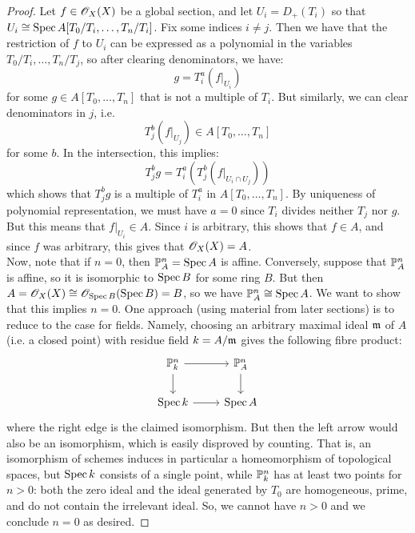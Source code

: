 \begin{proof}
	Let $f \in \mathscr{O}_X(X)$ be a global section, and let $U_i = D_{+}(T_i)$ so that $U_i \cong \operatorname{Spec} A[T_0/T_i,\ldots,T_n/T_i]$. Fix some indices $i \neq j$. Then we have that the restriction of $f$ to $U_i$ can be expressed as a polynomial in the variables $T_0/T_i,\ldots,T_n/T_j$, so after clearing denominators, we have:
	\[ g = T_i^a(f|_{U_i}) \]
	for some $g \in A[T_0,\ldots,T_n]$ that is not a multiple of $T_i$. But similarly, we can clear denominators in $j$, i.e.
	\[ T_j^b(f|_{U_j}) \in A[T_0,\ldots,T_n] \]
	for some $b$. In the intersection, this implies:
	\[ T_j^bg = T_i^a\left(T_j^b(f|_{U_i \cap U_j})\right) \]
	which shows that $T_j^bg$ is a multiple of $T_i^a$ in $A[T_0,\ldots,T_n]$. By uniqueness of polynomial representation, we must have $a=0$ since $T_i$ divides neither $T_j$ nor $g$. But this means that $f|_{U_i} \in A$. Since $i$ is arbitrary, this shows that $f \in A$, and since $f$ was arbitrary, this gives that $\mathscr{O}_X(X) = A$. \\
	
	Now, note that if $n = 0$, then $\mathbb{P}_A^n = \operatorname{Spec} A$ is affine. Conversely, suppose that $\mathbb{P}_A^n$ is affine, so it is isomorphic to $\operatorname{Spec} B$ for some ring $B$. But then $A = \mathscr{O}_X(X) \cong \mathscr{O}_{\operatorname{Spec} B}(\operatorname{Spec} B) = B$, so we have $\mathbb{P}_A^n \cong \operatorname{Spec} A$. We want to show that this implies $n=0$. One approach (using material from later sections) is to reduce to the case for fields. Namely, choosing an arbitrary maximal ideal $\mathfrak{m}$ of $A$ (i.e. a closed point) with residue field $k = A/\mathfrak{m}$ gives the following fibre product:
	\[ \begin{tikzcd} \PP_k^n \arrow{r}{} \arrow{d}{} & \PP_A^n \arrow{d}{} \\ \Spec k \arrow{r}{} & \Spec A \end{tikzcd} \]
	where the right edge is the claimed isomorphism. But then the left arrow would also be an isomorphism, which is easily disproved by counting. That is, an isomorphism of schemes induces in particular a homeomorphism of topological spaces, but $\operatorname{Spec} k$ consists of a single point, while $\mathbb{P}_k^n$ has at least two points for $n > 0$: both the zero ideal and the ideal generated by $T_0$ are homogeneous, prime, and do not contain the irrelevant ideal. So, we cannot have $n>0$ and we conclude $n=0$ as desired.
\end{proof}
